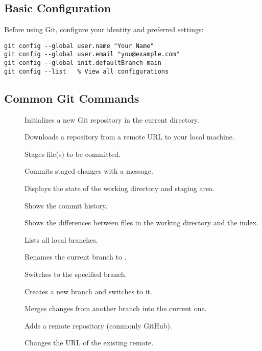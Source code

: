 \subsection*{Basic Configuration}
Before using Git, configure your identity and preferred settings:

\begin{verbatim}
git config --global user.name "Your Name"
git config --global user.email "you@example.com"
git config --global init.defaultBranch main
git config --list   % View all configurations
\end{verbatim}

\subsection*{Common Git Commands}
\begin{description}
  \item[] Initializes a new Git repository in the current directory.
  \item[] Downloads a repository from a remote URL to your local machine.
  \item[] Stages file(s) to be committed.
  \item[] Commits staged changes with a message.
  \item[] Displays the state of the working directory and staging area.
  \item[] Shows the commit history.
  \item[] Shows the differences between files in the working directory and the index.
  \item[] Lists all local branches.
  \item[] Renames the current branch to .
  \item[] Switches to the specified branch.
  \item[] Creates a new branch and switches to it.
  \item[] Merges changes from another branch into the current one.
  \item[] Adds a remote repository (commonly GitHub).
  \item[] Changes the URL of the existing remote.

\end{description}
